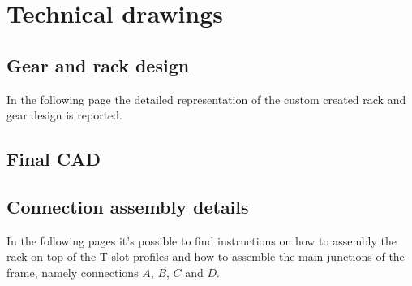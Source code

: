 \clearpage
\section{Technical drawings}
\subsection{Gear and rack design} \label{draw:gearrack}
In the following page the detailed representation of the custom created rack and gear design is reported.



\subsection{Final CAD}




\subsection{Connection assembly details}
In the following pages it's possible to find instructions on how to assembly the rack on top of the T-slot profiles and how to assemble the main junctions of the frame, namely connections $A$, $B$, $C$ and $D$.






